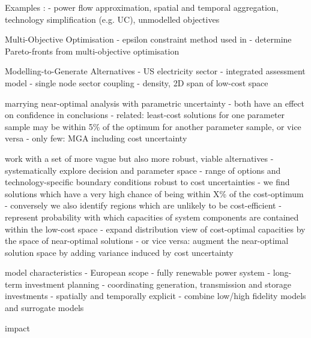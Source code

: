 
Examples \cite{DeCarolis2017}:
- power flow approximation, spatial and temporal aggregation, technology simplification (e.g. UC), unmodelled objectives

Multi-Objective Optimisation
- epsilon constraint method used in \cite{nearoptimal}
- determine Pareto-fronts from multi-objective optimisation \cite{mavrotas_effective_2009}

Modelling-to-Generate Alternatives
- \cite{DeCarolis2016} US electricity sector
- \cite{Price2017} integrated assessment model
- \cite{nacken_integrated_2019} single node sector coupling
- \cite{pedersen_modeling_2020} density, 2D span of low-cost space


marrying near-optimal analysis with parametric uncertainty
- both have an effect on confidence in conclusions
- related: least-cost solutions for one parameter sample may be within 5\% of the optimum for another parameter sample, or vice versa
- only few: MGA including cost uncertainty \cite{Trutnevyte2013,Li2017,lombardi_policy_2020}


work with a set of more vague but also more robust, viable alternatives
- systematically explore decision and parameter space
- range of options and technology-specific boundary conditions robust to cost uncertainties
- we find solutions which have a very high chance of being within X\% of the cost-optimum
- conversely we also identify regions which are unlikely to be cost-efficient
- represent probability with which capacities of system components are contained within the low-cost space
- expand distribution view of cost-optimal capacities by the space of near-optimal solutions
- or vice versa: augment the near-optimal solution space by adding variance induced by cost uncertainty

model characteristics
- European scope
- fully renewable power system
- long-term investment planning
- coordinating generation, transmission and storage investments
- spatially and temporally explicit
- combine low/high fidelity models and surrogate models

impact